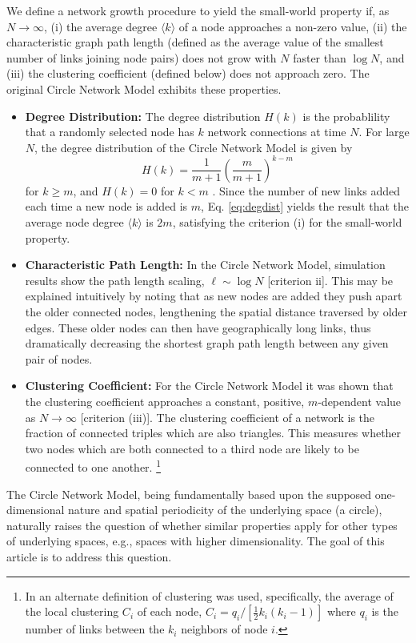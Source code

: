 \documentclass[aps,pre,manuscript,superscriptaddress,amsmath,amssymb,nofootinbib]{revtex4-1}
\begin{document}
We define a network growth procedure to yield the small-world property if, as $N \to \infty$,
(i) the average degree $\langle k \rangle$ of a node approaches a non-zero value,
(ii) the characteristic graph path length (defined as the average value of the smallest number of links joining node pairs) does not grow with $N$ faster than $\log N$, and
(iii) the clustering coefficient (defined below) does not approach zero.
The original Circle Network Model exhibits these properties.
\begin{itemize}
  \item \textbf{Degree Distribution:} The degree distribution $H(k)$ is the probablility that a randomly selected node has $k$ network connections at time $N$.
For large $N$, the degree distribution of the Circle Network Model is given by 
\begin{equation}\label{eq:degdist}
H(k) = \frac{1}{m+1}\left(\frac{m}{m+1}\right)^{k-m}
\end{equation}
for $k \geq m$, and $H(k) = 0$ for $k < m$ \cite{ozik2004}.
Since the number of new links added each time a new node is added is $m$, Eq. \eqref{eq:degdist} yields the result that the average node degree $\langle k \rangle$ is $2m$, satisfying the criterion (i) for the small-world property.
  \item \textbf{Characteristic Path Length:} In the Circle Network Model, simulation results show the path length scaling, $\ell \sim \log N$ [criterion ii].
This may be explained intuitively by noting that as new nodes are added they push apart the older connected nodes, lengthening the spatial distance traversed by older edges. 
These older nodes can then have geographically long links, thus dramatically decreasing the shortest graph path length between any given pair of nodes.
  \item \textbf{Clustering Coefficient:} For the Circle Network Model it was shown  that the clustering coefficient approaches a constant, positive, $m$-dependent value as $N \to \infty$ [criterion (iii)]. 
The clustering coefficient of a network is the fraction of connected triples which are also triangles.
This measures whether two nodes which are both connected to a third node are likely to be connected to one another. \footnote{In \cite{ozik2004} an alternate definition of clustering was used, specifically, the average of the local clustering $C_i$ of each node, $C_i = q_i/[\frac{1}{2} k_i (k_i-1)]$ where $q_i$ is the number of links between the $k_i$ neighbors of node $i$.}
\end{itemize}
The Circle Network Model, being fundamentally based upon the supposed one-dimensional nature and spatial periodicity of the underlying space (a circle), naturally raises the question of whether similar properties apply for other types of underlying spaces, e.g., spaces with higher dimensionality. 
The goal of this article is to address this question.
\end{document}
